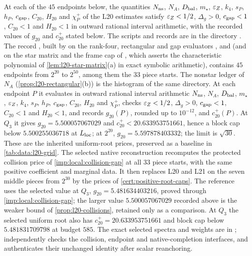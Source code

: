 \begin{certificate}\label{cert:l20-grid}
At each of the $45$ endpoints below, the quantities
$N_{\rm ns}$, $N_A$, $D_{\rm bal}$, $m_\star$, $\varepsilon_Z$, $k_4$,
$s_P$, $h_P$, $c_{\rm gap}$, $C_{20}$, $H_{20}$ and $\chi^+_P$ of
the L20 estimates satisfy $\varepsilon_Z<1/2$, $\Delta_g>0$,
$c_{\rm gap}<1$, $C_{20}<1$ and $H_{20}<1$ in outward rational
interval arithmetic, with the recorded values of $g_{20}$ and
$c^+_{20}$ stated below. The scripts and records are in the
directory . The record
, built by  on the
rank-four, rectangular and gap evaluators ,
 and  (and on the star
matrix and the frame cap of , which asserts the
characteristic polynomial of \cref{lem:l20-star-matrix}(a) in exact symbolic
arithmetic), contains $45$ endpoints from $2^{20}$ to $2^{50}$, among them the
$33$ piece starts. The nonstar ledger of $N_A$ (\cref{prop:l20-rectangular}(b))
is the histogram  of the
same directory. At each endpoint $P$ it evaluates in outward rational
interval arithmetic $N_{\rm ns}$, $N_A$, $D_{\rm bal}$, $m_\star$, $\varepsilon_Z$,
$k_4$, $s_P$, $h_P$, $c_{\rm gap}$, $C_{20}$, $H_{20}$ and $\chi^+_P$, checks
$\varepsilon_Z<1/2$, $\Delta_g>0$, $c_{\rm gap}<1$, $C_{20}<1$ and $H_{20}<1$, and
records $g_{20}(P)$, rounded up to $10^{-12}$, and $c^+_{20}(P)$. At $Q_3$ it
gives $g_{20}=5.500057067029$ and $c^+_{20}<20.633953751661$, hence a block
cap below $5.500255036718$ at $L_{\rm loc}$; at $2^{20}$, $g_{20}=5.597878403332$;
the limit is $\sqrt{30}$. These are the inherited uniform-root prices, preserved as a baseline in
\cref{tab:data:l20-grid}. The selected native reconstruction recomputes
the protected collision price of \cref{imp:local:collision-gap} at all
33 piece starts, with the same positive coefficient and marginal data.
It then replaces L20 and L21 on the seven middle pieces from $2^{30}$ by the
prices of \cref{cert:positive-root-caps}. The reference uses
the selected value at $Q_3$, $g_{20}=5.481634403216$, proved
through \cref{imp:local:collision-gap}; the larger value
$5.500057067029$ recorded above is the weaker bound of
\cref{prop:l20-collisions}, retained only as a comparison. At
$Q_3$ the selected uniform root also has
$c^+_{20}=20.633953751661$ and
block cap below $5.481831709798$ at budget $585$.
The exact selected spectra and weights are in
;
 independently
checks the collision, endpoint and native-completion interfaces,
and  authenticates their
unchanged identity after scalar reanchoring.
\end{certificate}

